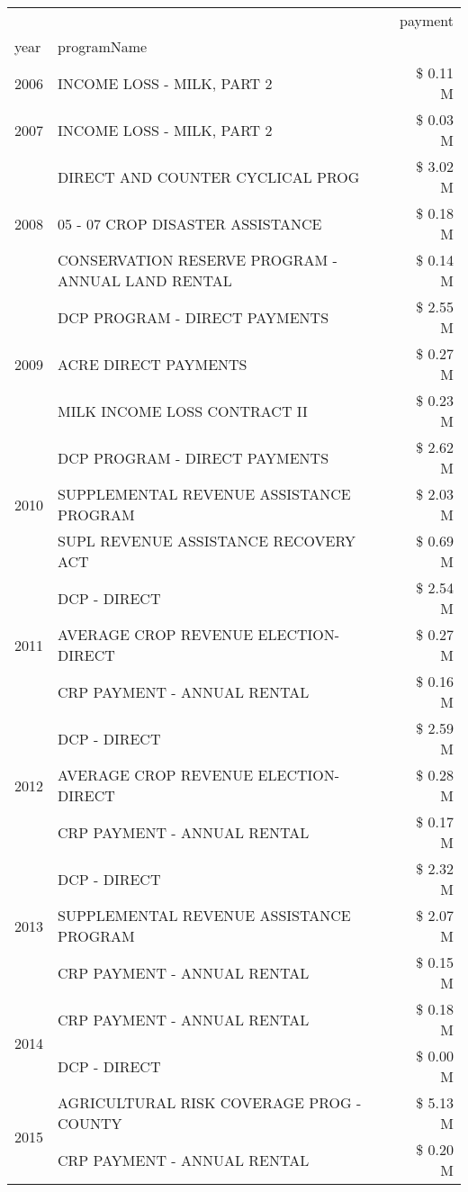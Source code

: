 \begin{tabular}{llr}
\toprule
 &  & payment \\
year & programName &  \\
\midrule
2006 & INCOME LOSS - MILK, PART 2 & \$ 0.11 M \\
\cline{1-3}
2007 & INCOME LOSS - MILK, PART 2 & \$ 0.03 M \\
\cline{1-3}
\multirow[t]{3}{*}{2008} & DIRECT AND COUNTER CYCLICAL PROG & \$ 3.02 M \\
 & 05 - 07 CROP DISASTER ASSISTANCE & \$ 0.18 M \\
 & CONSERVATION RESERVE PROGRAM - ANNUAL LAND RENTAL & \$ 0.14 M \\
\cline{1-3}
\multirow[t]{3}{*}{2009} & DCP PROGRAM - DIRECT PAYMENTS & \$ 2.55 M \\
 & ACRE DIRECT PAYMENTS & \$ 0.27 M \\
 & MILK INCOME LOSS CONTRACT II & \$ 0.23 M \\
\cline{1-3}
\multirow[t]{3}{*}{2010} & DCP PROGRAM - DIRECT PAYMENTS & \$ 2.62 M \\
 & SUPPLEMENTAL REVENUE ASSISTANCE PROGRAM & \$ 2.03 M \\
 & SUPL REVENUE ASSISTANCE RECOVERY ACT & \$ 0.69 M \\
\cline{1-3}
\multirow[t]{3}{*}{2011} & DCP - DIRECT & \$ 2.54 M \\
 & AVERAGE CROP REVENUE ELECTION-DIRECT & \$ 0.27 M \\
 & CRP PAYMENT - ANNUAL RENTAL & \$ 0.16 M \\
\cline{1-3}
\multirow[t]{3}{*}{2012} & DCP - DIRECT & \$ 2.59 M \\
 & AVERAGE CROP REVENUE ELECTION-DIRECT & \$ 0.28 M \\
 & CRP PAYMENT - ANNUAL RENTAL & \$ 0.17 M \\
\cline{1-3}
\multirow[t]{3}{*}{2013} & DCP - DIRECT & \$ 2.32 M \\
 & SUPPLEMENTAL REVENUE ASSISTANCE PROGRAM & \$ 2.07 M \\
 & CRP PAYMENT - ANNUAL RENTAL & \$ 0.15 M \\
\cline{1-3}
\multirow[t]{2}{*}{2014} & CRP PAYMENT - ANNUAL RENTAL & \$ 0.18 M \\
 & DCP - DIRECT & \$ 0.00 M \\
\cline{1-3}
\multirow[t]{3}{*}{2015} & AGRICULTURAL RISK COVERAGE PROG - COUNTY & \$ 5.13 M \\
 & CRP PAYMENT - ANNUAL RENTAL & \$ 0.20 M \\

\end{tabular}
